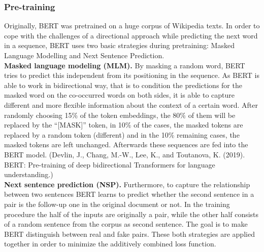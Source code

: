 
\subsubsection{Pre-training}
\label{bert_pretrain}

Originally, BERT was pretrained on a huge corpus of Wikipedia texts. In order 
to cope with the challenges of a directional approach while predicting the next 
word in a sequence, BERT uses two basic strategies during pretraining: Masked 
Language Modelling and Next Sentence Prediction.
\\

\textbf{Masked language modeling (MLM).}
By masking a random word, BERT tries to predict this independent from its 
positioning in the sequence. As BERT is able to work in bidirectional way, that 
is to condition the predictions for the masked word on the co-occurred words on 
both sides, it is able to capture different and more flexible information about 
the context of a certain word. After randomly choosing  15\% of the token 
embeddings, the 80\% of them will be replaced by the “[MASK]” token, in 10\% of 
the cases, the masked tokens are replaced by a random token (different) and in 
the 10\% remaining cases, the masked tokens are left unchanged. Afterwards these 
sequences are fed into the BERT model. (Devlin, J., Chang, M.-W., Lee, K., and 
Toutanova, K. (2019). BERT: Pre-training of deep bidirectional Transformers for 
language understanding.)
\\

\textbf{Next sentence prediction (NSP).}
Furthermore, to capture the relationship between two sentences BERT learns to 
predict whether the second sentence in a pair is the follow-up one in the 
original document or not. In the training procedure the half of the inputs are 
originally a pair, while the other half consists of a random sentence from the 
corpus as second sentence. The goal is to make BERT distinguish between real and 
fake pairs. 
These both strategies are applied together in order to minimize the additively 
combined loss function.

% 


